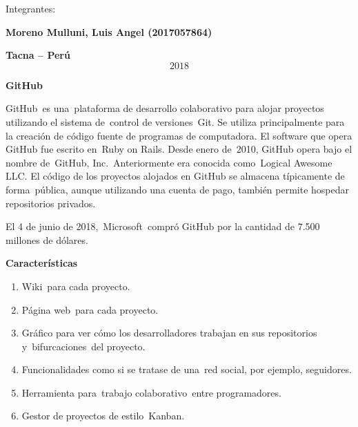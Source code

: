 \documentclass{article} %
\begin{document}
\noindent \textbf{}

\noindent Integrantes:

\noindent \textbf{\textit{}}

\noindent 

\noindent \textbf{Moreno Mulluni, Luis Angel     (2017057864)}

\noindent \textbf{\textit{ }}

\noindent 

\noindent 

\noindent \textbf{Tacna -- Per\'{u}}
\[2018\] 
\textbf{\textit{}}

\noindent \textbf{}

\noindent \textbf{\eject }

\noindent \textbf{GitHub}

\noindent GitHub~es una~plataforma de desarrollo colaborativo para alojar proyectos utilizando el sistema de~control de versiones~Git. Se utiliza principalmente para la creaci\'{o}n de c\'{o}digo fuente de programas de computadora. El software que opera GitHub fue escrito en~Ruby on Rails. Desde enero de~2010, GitHub opera bajo el nombre de~GitHub, Inc.~Anteriormente era conocida como~Logical Awesome LLC. El c\'{o}digo de los proyectos alojados en GitHub se almacena t\'{i}picamente de forma~p\'{u}blica, aunque utilizando una cuenta de pago, tambi\'{e}n permite hospedar repositorios privados.

\noindent El 4 de junio de 2018,~Microsoft~compr\'{o} GitHub por la cantidad de 7.500 millones de d\'{o}lares.

\noindent \textbf{Caracter\'{i}sticas}

\begin{enumerate}
\item \textbf{ }Wiki~para cada proyecto.

\item  P\'{a}gina web~para cada proyecto.

\item  Gr\'{a}fico para ver c\'{o}mo los desarrolladores trabajan en sus repositorios y~bifurcaciones~del proyecto.

\item  Funcionalidades como si se tratase de una~red social, por ejemplo, seguidores.

\item  Herramienta para~trabajo colaborativo~entre programadores.

\item  Gestor de proyectos de estilo~Kanban.
\end{enumerate}
\end{document}
